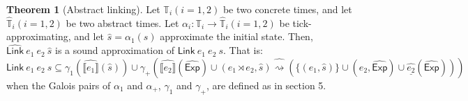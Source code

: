 \documentclass{article}
\theoremstyle{definition}
\newtheorem{thm}{Theorem}[section]
\newcommand*{\A}[1]{\widehat{#1}}
\newcommand*{\Time}{\mathbb{T}}
\newcommand*{\ATime}{\A{\Time}}
\newcommand*{\semarrow}{\rightsquigarrow}
\newcommand*{\link}[2]{{#1}\rtimes{#2}}
\newcommand*{\Exp}{\mathsf{Exp}}
\newcommand*{\Link}{\mathsf{Link}}
\newcommand*{\sembracket}[1]{\lBrack{#1}\rBrack}
\begin{document}
\begin{thm}[Abstract linking]
  Let $\Time_i(i=1,2)$ be two concrete times, and let $\ATime_i(i=1,2)$ be two abstract times.
  Let $\alpha_i:\Time_i\rightarrow\ATime_i(i=1,2)$ be tick-approximating, and let $\A{s}=\alpha_1(s)$ approximate the initial state.
  Then, $\A\Link\:e_1\:e_2\:\A{s}$ is a sound approximation of $\Link\:e_1\:e_2\:s$.
  That is:
  \[\Link\:e_1\:e_2\:s\subseteq\gamma_1(\A{\sembracket{e_1}}(\A{s}))\cup\gamma_+(\A{\sembracket{e_2}}(\A\Exp)\cup(\link{e_1}{e_2},\A{s})\A\semarrow(\{(e_1,\A{s})\}\cup(e_2,\A\Exp)\cup\A{\underline{e_2}}(\A\Exp)))\]
  when the Galois pairs of $\alpha_1$ and $\alpha_+$, $\gamma_1$ and $\gamma_+$, are defined as in section 5.
\end{thm}
\end{document}
